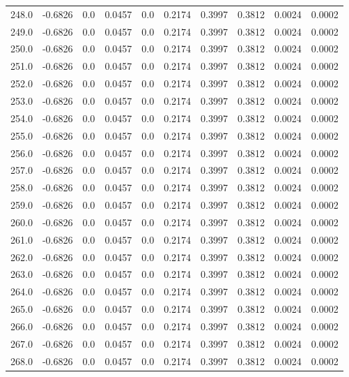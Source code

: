\begin{longtable}{lrrrrrrrrr}
248.0 & -0.6826 & 0.0 & 0.0457 & 0.0 & 0.2174 & 0.3997 & 0.3812 & 0.0024 & 0.0002 \\
249.0 & -0.6826 & 0.0 & 0.0457 & 0.0 & 0.2174 & 0.3997 & 0.3812 & 0.0024 & 0.0002 \\
250.0 & -0.6826 & 0.0 & 0.0457 & 0.0 & 0.2174 & 0.3997 & 0.3812 & 0.0024 & 0.0002 \\
251.0 & -0.6826 & 0.0 & 0.0457 & 0.0 & 0.2174 & 0.3997 & 0.3812 & 0.0024 & 0.0002 \\
252.0 & -0.6826 & 0.0 & 0.0457 & 0.0 & 0.2174 & 0.3997 & 0.3812 & 0.0024 & 0.0002 \\
253.0 & -0.6826 & 0.0 & 0.0457 & 0.0 & 0.2174 & 0.3997 & 0.3812 & 0.0024 & 0.0002 \\
254.0 & -0.6826 & 0.0 & 0.0457 & 0.0 & 0.2174 & 0.3997 & 0.3812 & 0.0024 & 0.0002 \\
255.0 & -0.6826 & 0.0 & 0.0457 & 0.0 & 0.2174 & 0.3997 & 0.3812 & 0.0024 & 0.0002 \\
256.0 & -0.6826 & 0.0 & 0.0457 & 0.0 & 0.2174 & 0.3997 & 0.3812 & 0.0024 & 0.0002 \\
257.0 & -0.6826 & 0.0 & 0.0457 & 0.0 & 0.2174 & 0.3997 & 0.3812 & 0.0024 & 0.0002 \\
258.0 & -0.6826 & 0.0 & 0.0457 & 0.0 & 0.2174 & 0.3997 & 0.3812 & 0.0024 & 0.0002 \\
259.0 & -0.6826 & 0.0 & 0.0457 & 0.0 & 0.2174 & 0.3997 & 0.3812 & 0.0024 & 0.0002 \\
260.0 & -0.6826 & 0.0 & 0.0457 & 0.0 & 0.2174 & 0.3997 & 0.3812 & 0.0024 & 0.0002 \\
261.0 & -0.6826 & 0.0 & 0.0457 & 0.0 & 0.2174 & 0.3997 & 0.3812 & 0.0024 & 0.0002 \\
262.0 & -0.6826 & 0.0 & 0.0457 & 0.0 & 0.2174 & 0.3997 & 0.3812 & 0.0024 & 0.0002 \\
263.0 & -0.6826 & 0.0 & 0.0457 & 0.0 & 0.2174 & 0.3997 & 0.3812 & 0.0024 & 0.0002 \\
264.0 & -0.6826 & 0.0 & 0.0457 & 0.0 & 0.2174 & 0.3997 & 0.3812 & 0.0024 & 0.0002 \\
265.0 & -0.6826 & 0.0 & 0.0457 & 0.0 & 0.2174 & 0.3997 & 0.3812 & 0.0024 & 0.0002 \\
266.0 & -0.6826 & 0.0 & 0.0457 & 0.0 & 0.2174 & 0.3997 & 0.3812 & 0.0024 & 0.0002 \\
267.0 & -0.6826 & 0.0 & 0.0457 & 0.0 & 0.2174 & 0.3997 & 0.3812 & 0.0024 & 0.0002 \\
268.0 & -0.6826 & 0.0 & 0.0457 & 0.0 & 0.2174 & 0.3997 & 0.3812 & 0.0024 & 0.0002 \\

\end{longtable}

